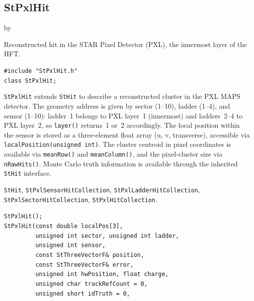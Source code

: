 \documentclass[twoside]{article}
\newcommand{\entrylabel}[1]{\mbox{\textbf{{#1}}}\hfil}%
\newenvironment{entry}
{\begin{list}{}%
    {\renewcommand{\makelabel}{\entrylabel}%
     \setlength{\labelwidth}{90pt}%
     \setlength{\leftmargin}{\labelwidth}
     \advance\leftmargin by \labelsep%
      }%
    }%
  {\end{list}}
\newcommand{\Entrylabel}[1]%
{\raisebox{0pt}[1ex][0pt]{\makebox[\labelwidth][l]%
    {\parbox[t]{\labelwidth}{\hspace{0pt}\textbf{{#1}}}}}}
\newenvironment{Entry}%
{\renewcommand{\entrylabel}{\Entrylabel}\begin{entry}}%
  {\end{entry}}
\begin{document}
\subsection{StPxlHit}
\label{sec:StPxlHit}
\begin{Entry}
\item[Summary] Reconstructed hit in the STAR Pixel Detector (PXL), the
    innermost layer of the HFT.
\item[Synopsis]
    \verb+#include "StPxlHit.h"+\\
    \verb+class StPxlHit;+\\
\item[Description]
    \texttt{StPxlHit} extends \texttt{StHit} to describe a reconstructed
    cluster in the PXL MAPS detector.  The geometry address is given by
    sector (1--10), ladder (1--4), and sensor (1--10): ladder~1 belongs to
    PXL layer~1 (innermost) and ladders~2--4 to PXL layer~2, so
    \verb+layer()+ returns~1 or~2 accordingly.  The local position within the
    sensor is stored as a three-element float array (u, v, transverse),
    accessible via \verb+localPosition(unsigned int)+.  The cluster centroid
    in pixel coordinates is available via \verb+meanRow()+ and
    \verb+meanColumn()+, and the pixel-cluster size via \verb+nRawHits()+.
    Monte Carlo truth information is available through the inherited
    \texttt{StHit} interface.
\item[Related Classes]
    \texttt{StHit}, \texttt{StPxlSensorHitCollection},
    \texttt{StPxlLadderHitCollection}, \texttt{StPxlSectorHitCollection},
    \texttt{StPxlHitCollection}.
\item[Public\\ Constructors]
    \verb+StPxlHit();+\\
    \verb+StPxlHit(const double localPos[3],+\\
    \verb+         unsigned int sector, unsigned int ladder,+\\
    \verb+         unsigned int sensor,+\\
    \verb+         const StThreeVectorF& position,+\\
    \verb+         const StThreeVectorF& error,+\\
    \verb+         unsigned int hwPosition, float charge,+\\
    \verb+         unsigned char trackRefCount = 0,+\\
    \verb+         unsigned short idTruth = 0,+\\

\end{Entry}
\end{document}
